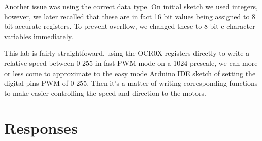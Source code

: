 \documentclass[letterpaper,11pt]{texMemo} %
\begin{document}
Another issue was using the correct data type. On initial sketch we used integers, 
however, we later recalled that these are in fact 16 bit values being assigned to 
8 bit accurate registers. To prevent overflow, we changed these to 8 bit c-character 
variables immediately.

This lab is fairly straightfoward, using the OCR0X registers directly to write a 
relative speed between 0-255 in fast PWM mode on a 1024 prescale, we can more or 
less come to approximate to the easy mode Arduino IDE sketch of setting the digital 
pins PWM of 0-255. Then it's a matter of writing corresponding functions to 
make easier controlling the speed and direction to the motors.


\section*{Responses}
\end{document}
